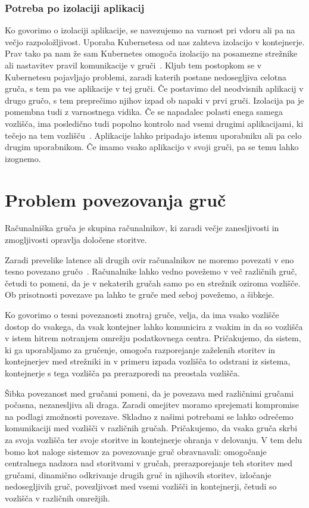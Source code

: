 \documentclass[a4paper, 12pt]{book}
\begin{document}
\subsection{Potreba po izolaciji aplikacij}
Ko govorimo o izolaciji aplikacije, se navezujemo na varnost pri vdoru ali pa na večjo razpoložljivost.
Uporaba Kubernetesa od nas zahteva izolacijo v kontejnerje.
Prav tako pa nam že sam Kubernetes omogoča izolacijo na posamezne strežnike~\cite{kube-network-policy} ali nastavitev pravil komunikacije v gruči~\cite{kube-pod-to-node}.
Kljub tem postopkom se v Kubernetesu pojavljajo problemi, zaradi katerih postane nedosegljiva celotna gruča, s tem pa vse aplikacije v tej gruči.
Če postavimo del neodvisnih aplikacij v drugo gručo, s tem preprečimo njihov izpad ob napaki v prvi gruči.
Izolacija pa je pomembna tudi z varnostnega vidika.
Če se napadalec polasti enega samega vozlišča, ima posledično tudi popolno kontrolo nad vsemi drugimi aplikacijami, ki tečejo na tem vozlišču~\cite{securing-kube}.
Aplikacije lahko pripadajo istemu uporabniku ali pa celo drugim uporabnikom.
Če imamo vsako aplikacijo v svoji gruči, pa se temu lahko izognemo.
\chapter{Problem povezovanja gruč}
Računalniška gruča je skupina računalnikov, ki zaradi večje zanesljivosti in zmogljivosti opravlja določene storitve.

Zaradi prevelike latence ali drugih ovir računalnikov ne moremo povezati v eno tesno povezano gručo~\cite{kube-and-edge}.
Računalnike lahko vedno povežemo v več različnih gruč, četudi to pomeni, da je v nekaterih gručah samo po en strežnik oziroma vozlišče.
Ob prisotnosti povezave pa lahko te gruče med seboj povežemo, a šibkeje.

Ko govorimo o tesni povezanosti znotraj gruče, velja, da ima vsako vozlišče dostop do vsakega, da vsak kontejner lahko komunicira z vsakim in da so vozlišča v istem hitrem notranjem omrežju podatkovnega centra. 
Pri\-ča\-ku\-je\-mo, da sistem, ki ga uporabljamo za gručenje, omogoča razporejanje zaželenih storitev in kontejnerjev med strežniki in v primeru izpada vozlišča to odstrani iz sistema, kontejnerje s tega vozlišča pa prerazporedi na preostala vozlišča.

Šibka povezanost med gručami pomeni, da je povezava med različnimi gručami počasna, nezanesljiva ali draga.
Zaradi omejitev moramo sprejemati kompromise na podlagi zmožnosti povezave.
Skladno z našimi potrebami se lahko odrečemo komunikaciji med vozlišči v različnih gručah.
Pričakujemo, da vsaka gruča skrbi za svoja vozlišča ter svoje storitve in kontejnerje ohranja v delovanju.
V tem delu bomo kot naloge sistemov za povezovanje gruč obravnavali: omogočanje centralnega nadzora nad storitvami v gručah, prerazporejanje teh storitev med gručami, dinamično odkrivanje drugih gruč in njihovih storitev, izločanje nedosegljivih gruč, povezljivost med vsemi vozlišči in kontejnerji, četudi so vozlišča v različnih omrežjih.
\end{document}
